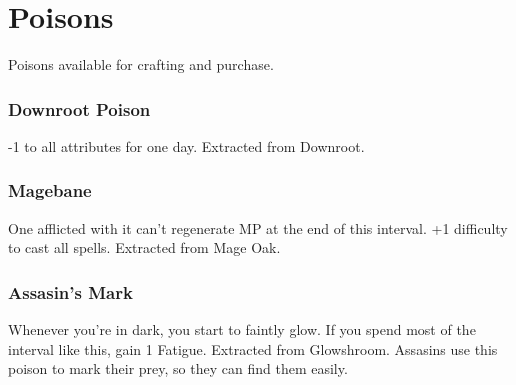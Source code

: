 \section{Poisons}

\begin{multicols}{2}

Poisons available for crafting and purchase.

\subsubsection{Downroot Poison}

-1 to all attributes for one day. Extracted from Downroot.

\subsubsection{Magebane}

One afflicted with it can't regenerate MP at the end of this interval. +1 difficulty to cast all spells. Extracted from Mage Oak.

\subsubsection{Assasin's Mark}

Whenever you're in dark, you start to faintly glow. If you spend most of the interval like this, gain 1 Fatigue. Extracted from Glowshroom. Assasins use this poison to mark their prey, so they can find them easily.

\end{multicols}
